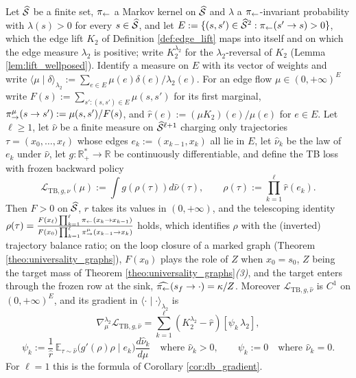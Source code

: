 \begin{proposition}[TB gradient]\label{prop:tb_gradient}
Let $\widehat{\mathcal S}$ be a finite set, $\pi_{\leftarrow}$ a Markov kernel on $\widehat{\mathcal S}$ and $\lambda$ a $\pi_{\leftarrow}$-invariant probability with $\lambda(s)>0$ for every $s\in\widehat{\mathcal S}$, and let $E:=\{(s,s')\in\widehat{\mathcal S}^2:\pi_{\leftarrow}(s'\rightarrow s)>0\}$, which the edge lift $K_2$ of Definition \ref{def:edge_lift} maps into itself and on which the edge measure $\lambda_2$ is positive; write $K_2^{\lambda_2}$ for the $\lambda_2$-reversal of $K_2$ (Lemma \ref{lem:lift_wellposed}). Identify a measure on $E$ with its vector of weights and write $\langle\mu\mid\delta\rangle_{\lambda_2}:=\sum_{e\in E}\mu(e)\delta(e)/\lambda_2(e)$. For an edge flow $\mu\in(0,+\infty)^E$ write $F(s):=\sum_{s':(s,s')\in E}\mu(s,s')$ for its first marginal, $\pi_{\rightarrow}^\mu(s\rightarrow s'):=\mu(s,s')/F(s)$, and $\widehat r(e):=(\mu K_2)(e)/\mu(e)$ for $e\in E$. Let $\ell\geq1$, let $\widehat\nu$ be a finite measure on $\widehat{\mathcal S}^{\ell+1}$ charging only trajectories $\tau=(x_0,\dots,x_\ell)$ whose edges $e_k:=(x_{k-1},x_k)$ all lie in $E$, let $\widehat\nu_k$ be the law of $e_k$ under $\widehat\nu$, let $g:\mathbb R_+^*\rightarrow\mathbb R$ be continuously differentiable, and define the TB loss with frozen backward policy
\begin{equation}
    \mathcal L_{\mathrm{TB},g,\widehat\nu}(\mu) := \int g\left(\rho(\tau)\right) d\widehat\nu(\tau),
    \qquad \rho(\tau) := \prod_{k=1}^{\ell} \widehat r(e_k).
\end{equation}
Then $F>0$ on $\widehat{\mathcal S}$, $\widehat r$ takes its values in $(0,+\infty)$, and the telescoping identity
$\rho(\tau) = \frac{F(x_\ell)\prod_{k=1}^\ell\pi_{\leftarrow}(x_k\rightarrow x_{k-1})}{F(x_0)\prod_{k=1}^\ell\pi_{\rightarrow}^\mu(x_{k-1}\rightarrow x_k)}$
holds, which identifies $\rho$ with the (inverted) trajectory balance ratio; on the loop closure of a marked graph (Theorem \ref{theo:universality_graphs}), $F(x_0)$ plays the role of $Z$ when $x_0=s_0$, $Z$ being the target mass of Theorem \ref{theo:universality_graphs}\emph{(3)}, and the target enters through the frozen row at the sink, $\widehat{\pi_{\leftarrow}}(s_f\rightarrow\cdot)=\kappa/Z$. Moreover $\mathcal L_{\mathrm{TB},g,\widehat\nu}$ is $C^1$ on $(0,+\infty)^E$, and its gradient in $\langle\cdot\mid\cdot\rangle_{\lambda_2}$ is
\begin{equation}\label{eq:tb_gradient}
    \nabla^{\lambda_2}_{\mu} \mathcal L_{\mathrm{TB},g,\widehat\nu}
    = \sum_{k=1}^{\ell} \left(K_2^{\lambda_2} - \widehat r\right)\left[\psi_k\, \lambda_2\right],
\end{equation}
\begin{equation}
    \psi_k := \frac{1}{\widehat r}\,\mathbb E_{\tau\sim\widehat\nu}\bigl( g'(\rho)\rho \mid e_k \bigr)\frac{d\widehat\nu_k}{d\mu}\quad\text{where }\widehat\nu_k>0,\qquad \psi_k:=0\quad\text{where }\widehat\nu_k=0.
\end{equation}
For $\ell = 1$ this is the formula of Corollary \ref{cor:db_gradient}.
\end{proposition}

